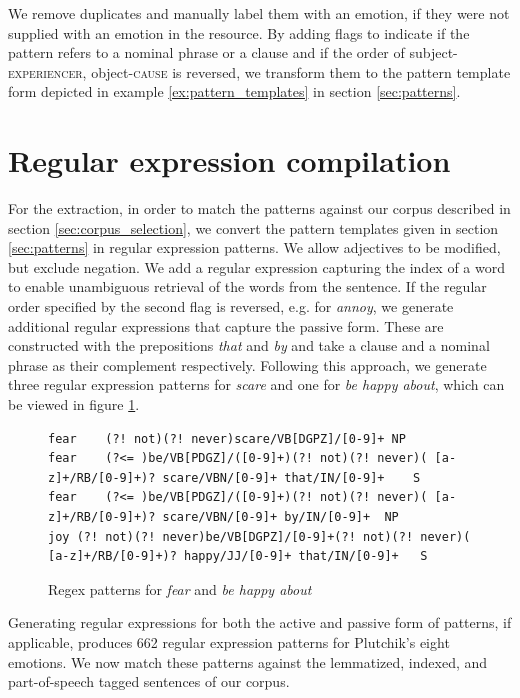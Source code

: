 We remove duplicates and manually label them with an emotion, if they were not supplied with an emotion in the resource. By adding flags to indicate if the pattern refers to a nominal phrase or a clause and if the order of subject-\textsc{experiencer}, object-\textsc{cause} is reversed, we transform them to the pattern template form depicted in example \ref{ex:pattern_templates} in section \ref{sec:patterns}.

\section{Regular expression compilation} \label{sec:regex}

For the extraction, in order to match the patterns against our corpus described in section \ref{sec:corpus_selection}, we convert the pattern templates given in section \ref{sec:patterns} in regular expression patterns. We allow adjectives to be modified, but exclude negation. We add a regular expression capturing the index of a word to enable unambiguous retrieval of the words from the sentence. If the regular order specified by the second flag is reversed, e.g. for \textit{annoy}, we generate additional regular expressions that capture the passive form. These are constructed with the prepositions \textit{that} and \textit{by} and take a clause and a nominal phrase as their complement respectively. Following this approach, we generate three regular expression patterns for \textit{scare} and one for \textit{be happy about}, which can be viewed in figure \ref{fig:patterns}.

\begin{figure}
\begin{lstlisting}
fear	(?! not)(?! never)scare/VB[DGPZ]/[0-9]+	NP
fear	(?<= )be/VB[PDGZ]/([0-9]+)(?! not)(?! never)( [a-z]+/RB/[0-9]+)? scare/VBN/[0-9]+ that/IN/[0-9]+	S
fear	(?<= )be/VB[PDGZ]/([0-9]+)(?! not)(?! never)( [a-z]+/RB/[0-9]+)? scare/VBN/[0-9]+ by/IN/[0-9]+	NP
joy	(?! not)(?! never)be/VB[DGPZ]/[0-9]+(?! not)(?! never)( [a-z]+/RB/[0-9]+)? happy/JJ/[0-9]+ that/IN/[0-9]+	S
\end{lstlisting}
\caption{Regex patterns for \textit{fear} and \textit{be happy about}}\label{fig:patterns}
\end{figure}

Generating regular expressions for both the active and passive form of patterns, if applicable, produces 662 regular expression patterns for Plutchik's eight emotions. We now match these patterns against the lemmatized, indexed, and part-of-speech tagged sentences of our corpus.

